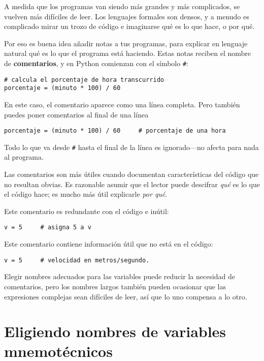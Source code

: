 A medida que los programas van siendo más grandes y más complicados, se vuelven más difíciles
de leer. Los lenguajes formales son densos, y a menudo es complicado
mirar un trozo de código e imaginarse qué es lo que hace, o por qué.

Por eso es buena idea añadir notas a tus programas, para explicar
en lenguaje natural qué es lo que el programa está haciendo. Estas notas reciben el nombre de
{\bf comentarios}, y en Python comienzan con el símbolo \verb"#":


\beforeverb
\begin{verbatim}
# calcula el porcentaje de hora transcurrido
porcentaje = (minuto * 100) / 60
\end{verbatim}
\afterverb
%
En este caso, el comentario aparece como una línea completa. Pero también puedes
poner comentarios al final de una línea

\beforeverb
\begin{verbatim}
porcentaje = (minuto * 100) / 60     # porcentaje de una hora
\end{verbatim}
\afterverb
%
Todo lo que va desde {\tt \#} hasta el final de la línea es ignorado---no
afecta para nada al programa.

Las comentarios son más útiles cuando documentan características del código
que no resultan obvias. Es razonable asumir que el lector puede descifrar
\emph{qué} es lo que el código hace; es mucho más útil explicarle \emph{por qué}.

Este comentario es redundante con el código e inútil:

\beforeverb
\begin{verbatim}
v = 5     # asigna 5 a v
\end{verbatim}
\afterverb
%
Este comentario contiene información útil que no está en el código:

\beforeverb
\begin{verbatim}
v = 5     # velocidad en metros/segundo. 
\end{verbatim}
\afterverb
%
Elegir nombres adecuados para las variables puede reducir la necesidad de comentarios, pero
los nombres largos también pueden ocasionar que las expresiones complejas sean difíciles de leer, así
que lo uno compensa a lo otro.

\section{Eligiendo nombres de variables mnemotécnicos}

